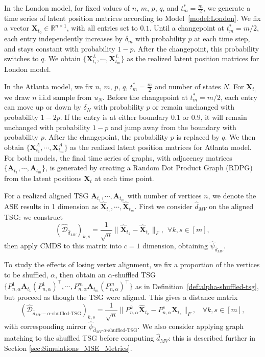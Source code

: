 \documentclass[12pt]{article}
\theoremstyle{definition}
\newcommand{\R}{\mathbb{R}}
\newcommand{\bA}{\mathbf{A}}
\newcommand{\bX}{\mathbf{X}}
\begin{document}
In the London model, for fixed values of $n$, $m$, $p$, $q$, and $t_m^*=\frac{m}{2}$, we generate a time series of latent position matrices according to Model~\ref{model:London}.
We fix a vector $\bX_{t_0} \in \R^{n\times 1}$, with all entries set to $0.1$.
Until a changepoint at $t_m^*=m/2$, each entry independently increases by $\delta_m$ with probability $p$ at each time step, and stays constant with probability $1-p$.
After the changepoint, this probability switches to $q$.
We obtain $\{\bX^L_{t_1},\cdots,\bX^L_{t_m}\}$ as the realized latent position matrices for London model. 

In the Atlanta model, we fix $n$, $m$, $p$, $q$, $t_m^*=\frac{m}{2}$ and number of states $N$.
For $\bX_{t_1}$ we draw $n$ i.i.d sample from $u_N$.
Before the changepoint at $t_m^*=m/2$, each entry can move up or down by $\delta_N$ with probability $p$ or remain unchanged with probability $1-2p$. 
If the entry is at either boundary $0.1$ or $0.9$, it will remain unchanged with probability $1-p$ and jump away from the boundary with probability $p$.  
After the changepoint, the probability $p$ is replaced by $q$.
We then obtain $\{\bX^A_{t_1},\cdots,\bX^A_{t_m}\}$ as the realized latent position matrices for Atlanta model.  For both models, the final time series of graphs, with adjacency matrices $\{\mathbf{A}_{t_1},\cdots,\mathbf{A}_{t_m}\}$, is generated by creating a Random Dot Product Graph (RDPG) from the latent positions $\mathbf{X}_t$ at each time point.


For a realized aligned TSG $\bA_{t_1},\cdots,\bA_{t_m}$ with number of vertices $n$, we denote the ASE results in 1 dimension as $\hat{\bX}_{t_1},\cdots,\hat{\bX}_{t_m}$.
First we consider $\hat{d}_{MV}$ on the aligned TSG: we construct 
$$
(\hat{\mathcal{D}}_{\hat{d}_{MV}})_{k,s} = \frac{1}{\sqrt{n}}\|\hat{\bX}_{t_k} - \hat{\bX}_{t_s}\|_F, ~~ \forall k,s \in [m],$$ then apply CMDS to this matrix into $c=1$ dimension, obtaining $\hat{\psi}_{\hat{d}_{MV}}$.

To study the effects of losing vertex alignment, we fix a proportion of the vertices to be shuffled, $\alpha$, then obtain an $\alpha$-shuffled TSG  $\{P_{n,\alpha}^1\bA_{t_1}(P_{n,\alpha}^1)^{\top},\cdots,P_{n,\alpha}^m\bA_{t_m}(P_{n,\alpha}^m)^{\top}\}$ as in Definition~\ref{def:alpha-shuffled-tsg}, but proceed as though the TSG were aligned. This gives a distance matrix
$$
\left(\hat{\mathcal{D}}_{\hat{d}_{MV}-\alpha\text{-shuffled-TSG}}\right)_{k,s} = 
\frac{1}{\sqrt{n}} \|P^k_{n, \alpha} \hat{\bX}_{t_k} - P^s_{n, \alpha}\hat{\bX}_{t_s} \|_F, ~~~~ \forall k,s \in [m] ,
$$ with corresponding mirror $\hat{\psi}_{\hat{d}_{MV}\text{-}\alpha\text{-shuffled-TSG}}$.
We also consider applying graph matching to the shuffled TSG before computing $\hat{d}_{MV}$: this is described further in Section \ref{sec:Simulations_MSE_Metrics}.  
\end{document}
